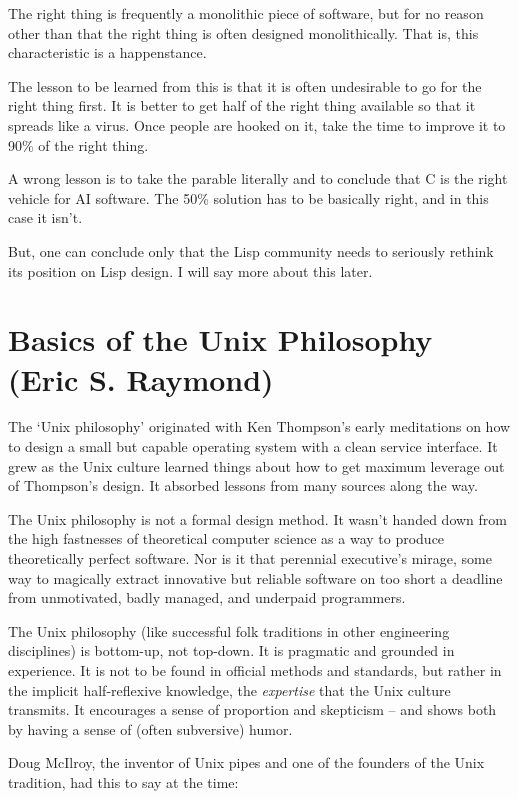 \documentclass[10pt,twoside,openright]{memoir}
\begin{document}
The right thing is frequently a monolithic piece of software, but for no reason other than that the right thing is often designed monolithically. That is, this characteristic is a happenstance.

The lesson to be learned from this is that it is often undesirable to go for the right thing first. It is better to get half of the right thing available so that it spreads like a virus. Once people are hooked on it, take the time to improve it to 90\% of the right thing.

A wrong lesson is to take the parable literally and to conclude that C is the right vehicle for AI software. The 50\% solution has to be basically right, and in this case it isn't.

But, one can conclude only that the Lisp community needs to seriously rethink its position on Lisp design. I will say more about this later.


\chapter{Basics of the Unix Philosophy (Eric S. Raymond)}

The `Unix philosophy' originated with Ken Thompson's early meditations on how to design a small but capable operating system with a clean service interface. It grew as the Unix culture learned things about how to get maximum leverage out of Thompson's design. It absorbed lessons from many sources along the way.

The Unix philosophy is not a formal design method. It wasn't handed down from the high fastnesses of theoretical computer science as a way to produce theoretically perfect software. Nor is it that perennial executive's mirage, some way to magically extract innovative but reliable software on too short a deadline from unmotivated, badly managed, and underpaid programmers.

The Unix philosophy (like successful folk traditions in other engineering disciplines) is bottom-up, not top-down. It is pragmatic and grounded in experience. It is not to be found in official methods and standards, but rather in the implicit half-reflexive knowledge, the \emph{expertise} that the Unix culture transmits. It encourages a sense of proportion and skepticism -- and shows both by having a sense of (often subversive) humor.

Doug McIlroy, the inventor of Unix pipes and one of the founders of the Unix tradition, had this to say at the time:
\end{document}
